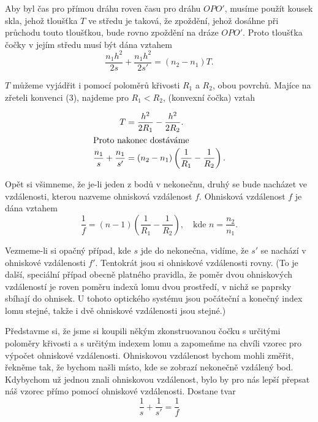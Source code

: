 {    Aby byl čas pro přímou dráhu roven času pro dráhu \(OPO'\), musíme použít kousek skla, jehož 
    tloušťka \(T\) ve středu je taková, že zpoždění, jehož dosáhne při průchodu touto tloušťkou, 
    bude rovno zpoždění na dráze \(OPO'\). Proto tloušťka čočky v jejím středu musí být dána vztahem
    \begin{equation}  \label{fyz:eq366}
      \frac{n_1h^2}{2s} + \frac{n_1h^2}{2s'} = (n_2 - n_1)T.
    \end{equation}
    
    \(T\) můžeme vyjádřit i pomocí poloměrů křivosti \(R_1\) a \(R_2\), obou povrchů. Majíce na 
    zřeteli konvenci (3), najdeme pro \(R_1<R_2\), (konvexní čočka) vztah
      
    \begin{subequations}\label{fyz:eq367}
      \begin{align}
       T  &= \frac{h^2}{2R_1} - \frac{h^2}{2R_2}.                        \label{fyz:eq367a} \\
        \shortintertext{Proto nakonec dostáváme}
       \frac{n_1}{s} + \frac{n_1}{s'} 
          &= (n_2 - n_1)\left(\frac{1}{R_1} - \frac{1}{R_2}\right).      \label{fyz:eq367b}
      \end{align}    
    \end{subequations}
    
    Opět si všimneme, že je-li jeden z bodů v nekonečnu, druhý se bude nacházet ve vzdálenosti, 
    kterou nazveme ohnisková vzdálenost \(f\). Ohnisková vzdálenost \(f\) je dána vztahem
    \begin{equation}  \label{fyz:eq368}
      \frac{1}{f} = (n - 1)\left(\frac{1}{R_1} - \frac{1}{R_2}\right), \quad\text{kde }
      n = \frac{n_2}{n_1}.
    \end{equation}
    
    Vezmeme-li si opačný případ, kde \(s\) jde do nekonečna, vidíme, že \(s'\) se nachází v 
    ohniskové vzdálenosti \(f'\). Tentokrát jsou si ohniskové vzdálenosti rovny. (To je další, 
    speciální případ obecně platného pravidla, že poměr dvou ohniskových vzdáleností je roven 
    poměru indexů lomu dvou prostředí, v nichž se paprsky sbíhají do ohnisek. U tohoto optického 
    systému jsou počáteční a konečný index lomu stejné, takže i dvě ohniskové vzdálenosti jsou 
    stejné.)
    
    Představme si, že jsme si koupili někým zkonstruovanou čočku s určitými poloměry křivosti a s 
    určitým indexem lomu a zapomeňme na chvíli vzorec pro výpočet ohniskové vzdálenosti. Ohniskovou 
    vzdálenost bychom mohli změřit, řekněme tak, že bychom našli místo, kde se zobrazí nekonečně 
    vzdálený bod. Kdybychom už jednou znali ohniskovou vzdálenost, bylo by pro nás lepší přepsat 
    náš vzorec přímo pomocí ohniskové vzdálenosti. Dostane tvar 
    \begin{equation}  \label{fyz:eq369}
      \frac{1}{s} + \frac{1}{s'} = \frac{1}{f}
    \end{equation}
    
}

